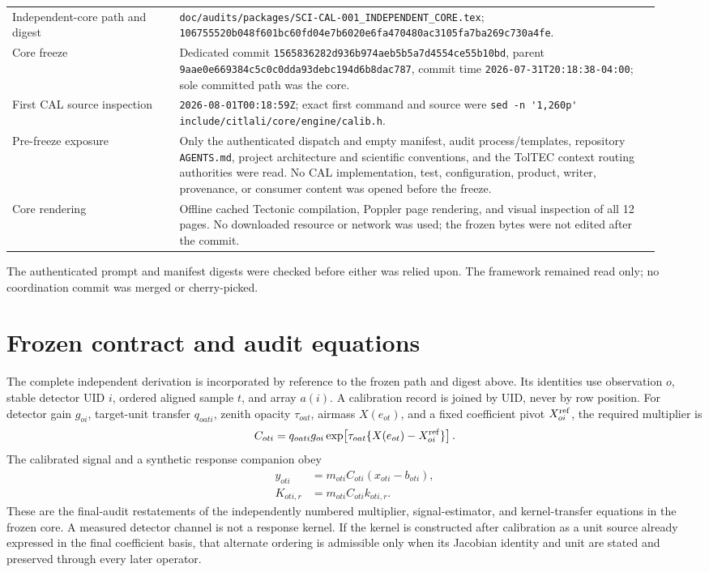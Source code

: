 \documentclass[11pt]{article}
\newcommand{\code}[1]{\nolinkurl{#1}}
\newcommand{\gitsha}[5]{\texttt{#1\allowbreak#2\allowbreak#3\allowbreak#4\allowbreak#5}}
\newcommand{\digest}[8]{\texttt{#1\allowbreak#2\allowbreak#3\allowbreak#4\allowbreak#5\allowbreak#6\allowbreak#7\allowbreak#8}}
\newcommand{\GoverningSHA}{\gitsha{9aae0e66}{9384c5c0}{c0dda93d}{ebc194d6}{b8dac787}}
\newcommand{\CoreFreezeSHA}{\gitsha{15658362}{82d936b9}{74aeb5b5}{a7d4554c}{e55b10bd}}
\newcommand{\CoreDigest}{\digest{10675552}{0b048f60}{1bc60fd0}{4e7b6020}{e6fa4704}{80ac3105}{fa7ba269}{c730a4fe}}
\begin{document}
\begin{longtable}{L{0.24\linewidth}L{0.69\linewidth}}
Independent-core path and digest &
\code{doc/audits/packages/SCI-CAL-001_INDEPENDENT_CORE.tex}; \CoreDigest.\\
Core freeze & Dedicated commit \CoreFreezeSHA, parent \GoverningSHA, commit
time \code{2026-07-31T20:18:38-04:00}; sole committed path was the core.\\
First CAL source inspection & \code{2026-08-01T00:18:59Z}; exact first
command and source were \code{sed -n '1,260p'
include/citlali/core/engine/calib.h}.\\
Pre-freeze exposure & Only the authenticated dispatch and empty manifest,
audit process/templates, repository \code{AGENTS.md}, project architecture and
scientific conventions, and the TolTEC context routing authorities were read.
No CAL implementation, test, configuration, product, writer, provenance, or
consumer content was opened before the freeze.\\
Core rendering & Offline cached Tectonic compilation, Poppler page rendering,
and visual inspection of all 12 pages.  No downloaded resource or network was
used; the frozen bytes were not edited after the commit.\\
\bottomrule
\end{longtable}

The authenticated prompt and manifest digests were checked before either was
relied upon.  The framework remained read only; no coordination commit was
merged or cherry-picked.

\section{Frozen contract and audit equations}

The complete independent derivation is incorporated by reference to the
frozen path and digest above.  Its identities use observation \(o\), stable
detector UID \(i\), ordered aligned sample \(t\), and array \(a(i)\).  A
calibration record is joined by UID, never by row position.  For detector gain
\(g_{oi}\), target-unit transfer \(q_{oati}\), zenith opacity
\(\tau_{oat}\), airmass \(X(e_{ot})\), and a fixed coefficient pivot
\(X^{\rm ref}_{oi}\), the required multiplier is
\begin{equation}
 C_{oti}=q_{oati}g_{oi}
 \exp\!\left[\tau_{oat}\{X(e_{ot})-X^{\rm ref}_{oi}\}\right].
 \label{eq:audit-required-factor}
\end{equation}
The calibrated signal and a synthetic response companion obey
\begin{align}
 y_{oti}&=m_{oti}C_{oti}(x_{oti}-b_{oti}),
 \label{eq:audit-required-signal}\\
 K_{oti,r}&=m_{oti}C_{oti}k_{oti,r}.
 \label{eq:audit-required-response}
\end{align}
These are the final-audit restatements of the independently numbered
multiplier, signal-estimator, and kernel-transfer equations in the frozen
core.  A measured detector channel is not a response kernel.  If the kernel is
constructed after calibration as a unit source already expressed in the final
coefficient basis, that alternate ordering is admissible only when its
Jacobian identity and unit are stated and preserved through every later
operator.
\end{document}
